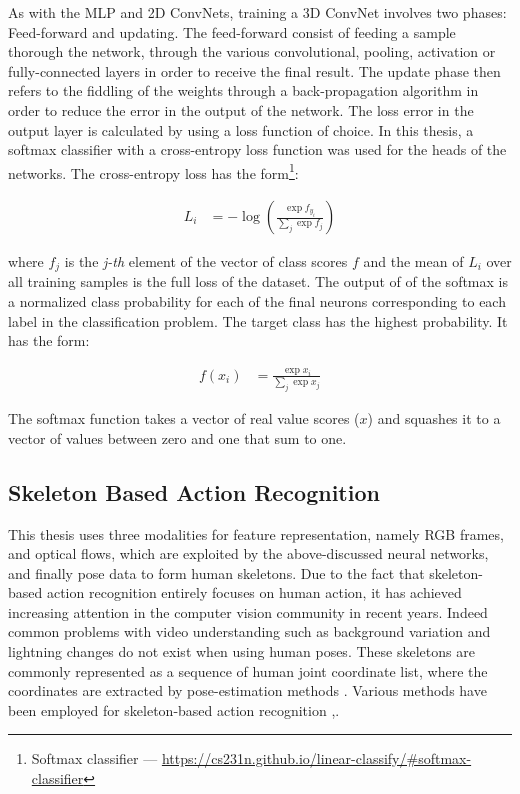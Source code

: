 \documentclass[extern,palatino]{cgMA}
\begin{document}
As with the MLP and 2D ConvNets, training a 3D ConvNet involves two phases: Feed-forward and updating. The feed-forward consist of feeding a sample thorough the network, through the various convolutional, pooling, activation or fully-connected layers in order to receive the final result. The update phase then refers to the fiddling of the weights through a back-propagation algorithm in order to reduce the error in the output of the network. The loss error in the output layer is calculated by using a loss function of choice. In this thesis, a softmax classifier with a cross-entropy loss function was used for the heads of the networks.  The cross-entropy loss has the form\footnote{Softmax classifier --- \url{https://cs231n.github.io/linear-classify/#softmax-classifier}}:

\begin{align*}
    L_{i} &= -\log \left(\frac{\exp{f_{y_{i}}} }{\sum_{j} \exp{f_{j}}} \right)
\end{align*}

where $f_{j}$ is the \textit{j-th} element of the vector of class scores $f$ and the mean of $L_{i}$ over all training samples is the full loss of the dataset. The output of of the softmax is a normalized class probability for each of the final neurons corresponding to each label in the classification problem. The target class has the highest probability. It has the form:

\begin{align*}
    f(x_{i}) &= \frac{\exp{x_{i}}}{\sum_{j} \exp{x_{j}}}
\end{align*}

The softmax function takes a vector of real value scores ($x$) and squashes it to a vector of values between zero and one that sum to one.

\subsection{Skeleton Based Action Recognition}
\label{background_skeleton_based_ar}

This thesis uses three modalities for feature representation, namely RGB frames, and optical flows, which are exploited by the above-discussed neural networks, and finally pose data to form human skeletons. Due to the fact that skeleton-based action recognition entirely focuses on human action, it has achieved increasing attention in the computer vision community in recent years. Indeed common problems with video understanding such as background variation and lightning changes do not exist when using human poses. These skeletons are commonly represented as a sequence of human joint coordinate list, where the coordinates are extracted by pose-estimation methods \cite{duan2021revisiting}. Various methods have been employed for skeleton-based action recognition \cite{du2015hierarchical},\cite{vemulapalli2014human}. 
\end{document}
